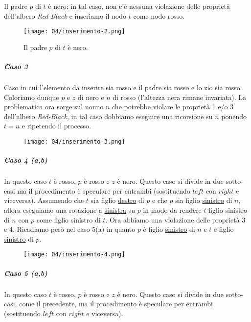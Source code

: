                 Il padre $ p $ di $ t $ è nero; in tal caso, non c'è nessuna violazione delle proprietà dell'albero \textit{Red-Black} e inseriamo il nodo $ t $ come nodo rosso.                
                \begin{figure}[H]
                    \centering
                    \texttt{[image: 04/inserimento-2.png]}
                    \caption{Il padre $p$ di $t$ è nero.}
                \end{figure}
                \subparagraph{Caso 3}
                    Caso in cui l'elemento da inserire sia rosso e il padre sia rosso e lo zio sia rosso. Coloriamo dunque $ p $ e $ z $ di nero e $ n $ di rosso (l'altezza nera rimane invariata).
                    La problematica ora sorge sul nonno $ n $ che potrebbe violare le proprietà 1 e/o 3 dell'albero \textit{Red-Black}, in tal caso dobbiamo eseguire una ricorsione su $ n $ ponendo $ t = n $ e ripetendo il processo.
                    \begin{figure}[H]
                        \centering
                        \texttt{[image: 04/inserimento-3.png]}
                    \end{figure}
                \subparagraph{Caso 4 (a,b)}
                    In questo caso $ t $ è rosso, $ p $ è rosso e $ z $ è nero. Questo caso si divide in due sotto-casi ma il procedimento è speculare per entrambi (sostituendo $ left $ con $ right $ e viceversa).\newline
                    Assumendo che $ t $ sia figlio \underline{destro} di $ p $ e che $ p $ sia figlio \underline{sinistro} di $ n $, allora eseguiamo una rotazione a \underline{sinistra} su $ p $ in modo da rendere $ t $ figlio sinistro di $ n $ con $ p $ come figlio sinistro di $ t $. Ora abbiamo una violazione delle proprietà 3 e 4. Ricadiamo però nel caso 5(a) in quanto $ p $ è figlio \underline{sinistro} di $ n $ e $ t $ è figlio \underline{sinistro} di $ p $.
                    \begin{figure}[H]
                        \centering
                        \texttt{[image: 04/inserimento-4.png]}
                    \end{figure}
                \subparagraph{Caso 5 (a,b)}
                    In questo caso $ t $ è rosso, $ p $ è rosso e $ z $ è nero. Questo caso si divide in due sotto-casi, come il precedente, ma il procedimento è speculare per entrambi (sostituendo $ left $ con $ right $ e viceversa).\newline

